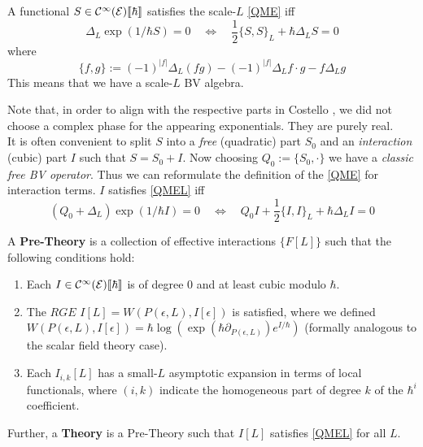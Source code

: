 \begin{definition}
  A functional $S \in \mathcal{C}^{\infty}({\mathcal{E}})\llbracket\hbar\rrbracket$ satisfies the scale-$L$ \eqref{QME} iff
  \begin{equation} \tag{$[QME]_L$} \label{QMEL}
    \Delta_L \exp\left( 1/\hbar S \right) = 0 \quad \iff \quad \frac{1}{2} \{S,S\}_L + \hbar \Delta_L S = 0
  \end{equation}
  where
  \begin{equation}
    \{f,g\} := (-1)^{|f|} \Delta_L (fg) - (-1)^{|f|} \Delta_L f \cdot g - f \Delta_L g
  \end{equation}
  This means that we have a scale-$L$ BV algebra.
\end{definition}

Note that, in order to align with the respective parts in Costello \cite{Costello}, we did not choose a complex phase for the appearing exponentials. They are purely real.\\

It is often convenient to split $S$ into a \emph{free} (quadratic) part $S_0$ and an \emph{interaction} (cubic) part $I$ such that $S = S_0 + I$. Now choosing $Q_0 := \{S_0, \cdot \}$ we have a \emph{classic free BV operator}. Thus we can reformulate the definition of the \eqref{QME} for interaction terms. $I$ satisfies \eqref{QMEL} iff
\begin{equation}
  (Q_0 + \Delta_L) \exp(1/\hbar I) = 0 \quad \iff \quad Q_0 I + \frac{1}{2} \{I,I\}_L + \hbar \Delta_L I = 0
\end{equation}

\begin{definition}
  A \textbf{Pre-Theory} is a collection of effective interactions $\{F[L]\}$ such that the following conditions hold:
  \begin{enumerate}
    \item Each $I \in \mathcal{C}^{\infty}({\mathcal{E}})\llbracket\hbar\rrbracket$ is of degree $0$ and at least cubic modulo $\hbar$.
    \item The $RGE$ $I[L] = W(P(\epsilon, L), I[\epsilon])$ is satisfied, where we defined \\$W(P(\epsilon, L), I[\epsilon]) = \hbar \log \left( \exp(\hbar \partial_{P(\epsilon,L)}) e^{I/\hbar} \right)$ (formally analogous to the scalar field theory case).
    \item Each $I_{i,k}[L]$ has a small-$L$ asymptotic expansion in terms of local functionals, where $(i,k)$ indicate the homogeneous part of degree $k$ of the $\hbar^i$ coefficient.
  \end{enumerate}
  Further, a \textbf{Theory} is a Pre-Theory such that $I[L]$ satisfies \eqref{QMEL} for all $L$.
\end{definition}

